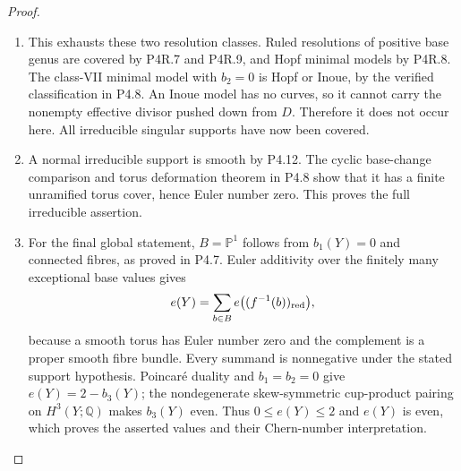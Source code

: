 \begin{proof}
\begin{enumerate}[label={$\langle1\rangle$\arabic*.},leftmargin=*]
\item This exhausts these two resolution
classes. Ruled resolutions of positive
base genus are covered by P4R.7
and P4R.9, and Hopf minimal models
by P4R.8. The class-VII minimal
model with $b_2=0$ is Hopf or Inoue,
by the verified classification in
P4.8. An Inoue model has no curves,
so it cannot carry the nonempty
effective divisor pushed down from
$D$. Therefore it does not occur
here. All irreducible singular
supports have now been covered.

\item A normal irreducible support is
smooth by P4.12. The cyclic
base-change comparison and torus
deformation theorem in P4.8 show
that it has a finite unramified
torus cover, hence Euler number
zero. This proves the full
irreducible assertion.

\item For the final global statement,
$B=\mathbb P^1$ follows from
$b_1(Y)=0$ and connected fibres,
as proved in P4.7. Euler
additivity over the finitely many
exceptional base values gives
\[
 e(Y)=\sum_{b\in B}
 e\bigl((f^{-1}(b))_{\rm red}\bigr),
\]
because a smooth torus has Euler
number zero and the complement
is a proper smooth fibre bundle.
Every summand is nonnegative
under the stated support
hypothesis. Poincar\'e duality
and $b_1=b_2=0$ give
$e(Y)=2-b_3(Y)$; the nondegenerate
skew-symmetric cup-product
pairing on $H^3(Y;\mathbb Q)$
makes $b_3(Y)$ even. Thus
$0\le e(Y)\le2$ and $e(Y)$ is
even, which proves the asserted
values and their Chern-number
interpretation.

\end{enumerate}
\end{proof}
